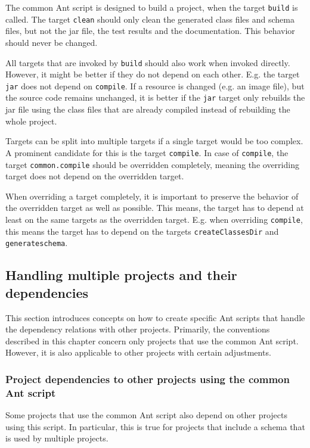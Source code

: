 \documentclass[a4paper,twoside,11pt,bibtotoc]{article}
\begin{document}
The common Ant script is designed to build a project, when the target \texttt{build} is called.
The target \texttt{clean} should only clean the generated class files and schema files, but not the jar file, the test results and the documentation.
This behavior should never be changed.

All targets that are invoked by \texttt{build} should also work when invoked directly.
However, it might be better if they do not depend on each other.
E.g. the target \texttt{jar} does not depend on \texttt{compile}.
If a resource is changed (e.g. an image file), but the source code remains unchanged, it is better if the \texttt{jar} target only rebuilds the jar file using the class files that are already compiled instead of rebuilding the whole project.

Targets can be split into multiple targets if a single target would be too complex.
A prominent candidate for this is the target \texttt{compile}.
In case of \texttt{compile}, the target \texttt{common.compile} should be overridden completely, meaning the overriding target does not depend on the overridden target.

When overriding a target completely, it is important to preserve the behavior of the overridden target as well as possible.
This means, the target has to depend at least on the same targets as the overridden target.
E.g. when overriding \texttt{compile}, this means the target has to depend on the targets \texttt{createClassesDir} and \texttt{generateschema}.

\subsection{Handling multiple projects and their dependencies}
\label{sec:dependency}
This section introduces concepts on how to create specific Ant scripts that handle the dependency relations with other projects.
Primarily, the conventions described in this chapter concern only projects that use the common Ant script.
However, it is also applicable to other projects with certain adjustments.

\subsubsection{Project dependencies to other projects using the common Ant script}
\label{sec:common_project_dep}
Some projects that use the common Ant script also depend on other projects using this script.
In particular, this is true for projects that include a schema that is used by multiple projects.
\end{document}
